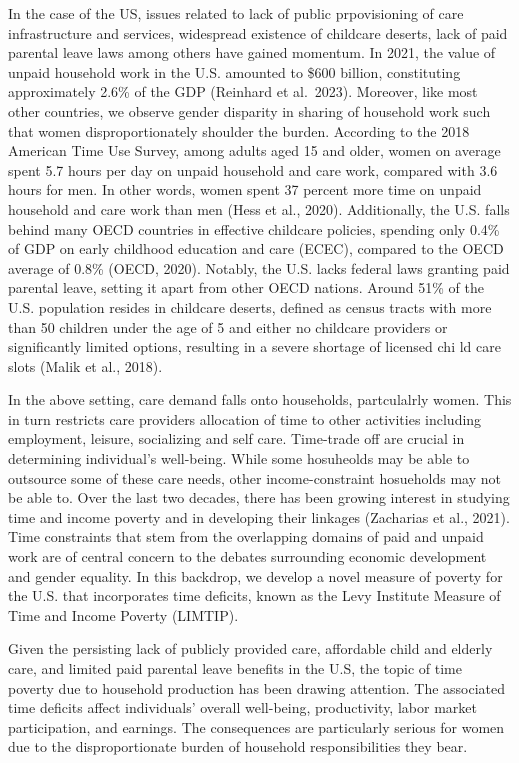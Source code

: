 \documentclass[
  11pt,
]{article}
\begin{document}
In the case of the US, issues related to lack of public prpovisioning of
care infrastructure and services, widespread existence of childcare
deserts, lack of paid parental leave laws among others have gained
momentum. In 2021, the value of unpaid household work in the U.S.
amounted to \$600 billion, constituting approximately 2.6\% of the GDP
(Reinhard et al.~2023). Moreover, like most other countries, we observe
gender disparity in sharing of household work such that women
disproportionately shoulder the burden. According to the 2018 American
Time Use Survey, among adults aged 15 and older, women on average spent
5.7 hours per day on unpaid household and care work, compared with 3.6
hours for men. In other words, women spent 37 percent more time on
unpaid household and care work than men (Hess et al., 2020).
Additionally, the U.S. falls behind many OECD countries in effective
childcare policies, spending only 0.4\% of GDP on early childhood
education and care (ECEC), compared to the OECD average of 0.8\% (OECD,
2020). Notably, the U.S. lacks federal laws granting paid parental
leave, setting it apart from other OECD nations. Around 51\% of the U.S.
population resides in childcare deserts, defined as census tracts with
more than 50 children under the age of 5 and either no childcare
providers or significantly limited options, resulting in a severe
shortage of licensed chi ld care slots (Malik et al., 2018).

In the above setting, care demand falls onto households, partculalrly
women. This in turn restricts care providers allocation of time to other
activities including employment, leisure, socializing and self care.
Time-trade off are crucial in determining individual's well-being. While
some hosuheolds may be able to outsource some of these care needs, other
income-constraint hosueholds may not be able to. Over the last two
decades, there has been growing interest in studying time and income
poverty and in developing their linkages (Zacharias et al., 2021). Time
constraints that stem from the overlapping domains of paid and unpaid
work are of central concern to the debates surrounding economic
development and gender equality. In this backdrop, we develop a novel
measure of poverty for the U.S. that incorporates time deficits, known
as the Levy Institute Measure of Time and Income Poverty (LIMTIP).

Given the persisting lack of publicly provided care, affordable child
and elderly care, and limited paid parental leave benefits in the U.S,
the topic of time poverty due to household production has been drawing
attention. The associated time deficits affect individuals' overall
well-being, productivity, labor market participation, and earnings. The
consequences are particularly serious for women due to the
disproportionate burden of household responsibilities they bear.
\end{document}
